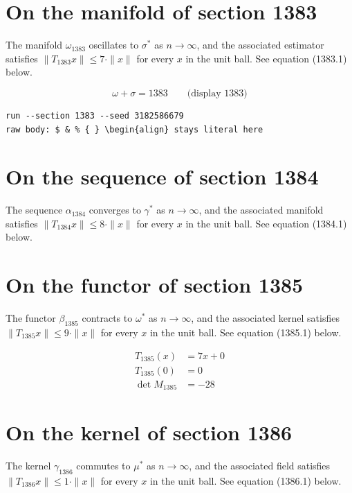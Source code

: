\documentclass{article}
\begin{document}
\section{On the manifold of section 1383}
The manifold $\omega_{1383}$ oscillates to $\sigma^{*}$ as $n \to \infty$,
and the associated estimator satisfies $\|T_{1383} x\| \leq 7 \cdot \|x\|$
for every $x$ in the unit ball. See equation (1383.1) below.

$$
\omega + \sigma = 1383 \qquad \text{(display 1383)}
$$

\begin{verbatim}
run --section 1383 --seed 3182586679
raw body: $ & % { } \begin{align} stays literal here
\end{verbatim}

\section{On the sequence of section 1384}
The sequence $\alpha_{1384}$ converges to $\gamma^{*}$ as $n \to \infty$,
and the associated manifold satisfies $\|T_{1384} x\| \leq 8 \cdot \|x\|$
for every $x$ in the unit ball. See equation (1384.1) below.

\section{On the functor of section 1385}
The functor $\beta_{1385}$ contracts to $\omega^{*}$ as $n \to \infty$,
and the associated kernel satisfies $\|T_{1385} x\| \leq 9 \cdot \|x\|$
for every $x$ in the unit ball. See equation (1385.1) below.

\begin{align}
T_{1385}(x) &= 7 x + 0 \\
T_{1385}(0) &= 0 \\
\det M_{1385} &= -28
\end{align}

\section{On the kernel of section 1386}
The kernel $\gamma_{1386}$ commutes to $\mu^{*}$ as $n \to \infty$,
and the associated field satisfies $\|T_{1386} x\| \leq 1 \cdot \|x\|$
for every $x$ in the unit ball. See equation (1386.1) below.
\end{document}
